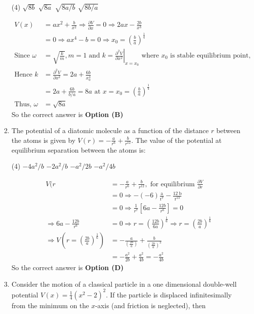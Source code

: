 \begin{enumerate}
\begin{tasks}(4)
\task[\textbf{A.}] $\sqrt{8 b}$
\task[\textbf{B.}] $\sqrt{8 a}$
\task[\textbf{C.}] $\sqrt{8 a / b}$
\task[\textbf{D.}] $\sqrt{8 b / a}$
\end{tasks}
\begin{answer}
\begin{align*}
V(x)&=a x^{2}+\frac{b}{x^{2}} \Rightarrow \frac{\partial V}{\partial x}=0 \Rightarrow 2 a x-\frac{2 b}{x^{3}}\\&=0 \Rightarrow a x^{4}-b=0 \Rightarrow x_{0}=\left(\frac{b}{a}\right)^{\frac{1}{4}}\\
\text{Since }\omega&=\sqrt{\frac{k}{m}}, m=1\text{ and }k=\left.\frac{\partial^{2} V}{\partial x^{2}}\right|_{x=x_{0}}\text{ where }x_{0} \text{ is stable equilibrium point,}\\
\text{Hence }k&=\frac{\partial^{2} V}{\partial x^{2}}=2 a+\frac{6 b}{x_{0}^{4}}\\&=2 a+\frac{6 b}{b / a}=8 a\text{ at }x=x_{0}=\left(\frac{b}{a}\right)^{\frac{1}{4}}\\
\text{Thus, }\omega&=\sqrt{8 a}
\end{align*}
So the correct answer is \textbf{Option (B)}
\end{answer}
\item The potential of a diatomic molecule as a function of the distance $r$ between the atoms is given by $V(r)=-\frac{a}{r^{6}}+\frac{b}{r^{12}} .$ The value of the potential at equilibrium separation between the atoms is:

\begin{tasks}(4)
\task[\textbf{A.}] $-4 a^{2} / b$
\task[\textbf{B.}] $-2 a^{2} / b$
\task[\textbf{C.}] $-a^{2} / 2 b$
\task[\textbf{D.}] $-a^{2} / 4 b$
\end{tasks}
\begin{answer}
\begin{align*}
V(r&=-\frac{a}{r^{6}}+\frac{b}{r^{12}},\text{ for equilibrium }\frac{\partial V}{\partial r}\\&=0 \Rightarrow-(-6) \frac{\mathrm{a}}{\mathrm{r}^{7}}-\frac{12 \mathrm{~b}}{\mathrm{r}^{13}}\\&=0 \Rightarrow \frac{1}{r^{7}}\left[6 a-\frac{12 b}{r^{6}}\right]=0\\
\Rightarrow 6 a-\frac{12 b}{r^{6}}&=0 \Rightarrow r=\left(\frac{12 b}{6 a}\right)^{\frac{1}{6}} \Rightarrow r=\left(\frac{2 b}{a}\right)^{\frac{1}{6}}\\
\Rightarrow V\left(r=\left(\frac{2 b}{a}\right)^{\frac{1}{6}}\right)&=-\frac{a}{\left(\frac{2 b}{a}\right)}+\frac{b}{\left(\frac{2 b}{a}\right)^{2}}\\&=-\frac{a^{2}}{2 b}+\frac{a^{2}}{4 b}=-\frac{a^{2}}{4 b}
\end{align*}
So the correct answer is \textbf{Option (D)}
\end{answer}
\item Consider the motion of a classical particle in a one dimensional double-well potential $V(x)=\frac{1}{4}\left(x^{2}-2\right)^{2}$. If the particle is displaced infinitesimally from the minimum on the $x$-axis (and friction is neglected), then


\end{enumerate}

